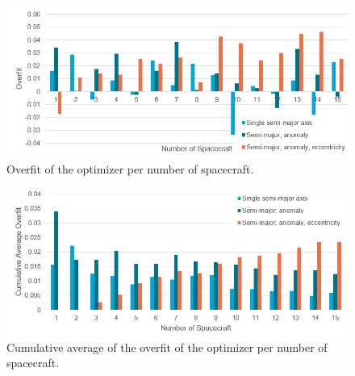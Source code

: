 \begin{figure}[htbp]
 \centering
 \includegraphics[width=1.0\textwidth]{img/overfit_free.png}
 \caption{Overfit of the optimizer per number of spacecraft.}
 \label{fig:overfit_free}
\end{figure}
\begin{figure}[htbp]
 \centering
 \includegraphics[width=1.0\textwidth]{img/overfit_free_cumulative_average.png}
 \caption{Cumulative average of the overfit of the optimizer per number of spacecraft.}
 \label{fig:overfit_free_cumulative_average}
\end{figure}

